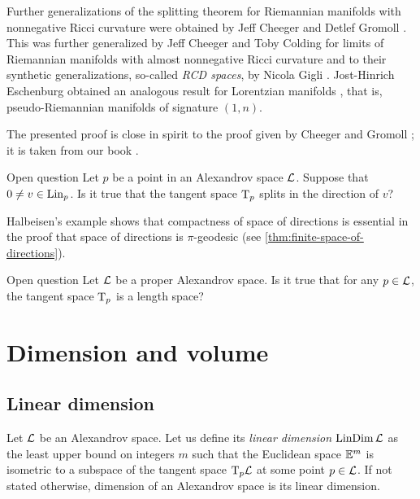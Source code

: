 Further generalizations of the splitting theorem for Riemannian manifolds with nonnegative Ricci curvature were obtained by Jeff Cheeger and Detlef Gromoll \cite{cheeger-gromoll-split}.
This was further generalized by Jeff Cheeger and Toby Colding for limits of Riemannian manifolds with almost nonnegative Ricci curvature \cite{cheeger-colding-alm-rigidity} and to their synthetic generalizations, so-called {}\emph{RCD spaces}, by Nicola Gigli \cite{gigli2013splitting, gigli-splitting-overview}.
Jost-Hinrich Eschenburg obtained an analogous result for  Lorentzian manifolds \cite{eshenburg-split}, that is, pseudo-Riemannian manifolds of signature $(1,n)$.

The presented proof is close in spirit to the proof given by Cheeger and Gromoll \cite{cheeger-gromoll-split};
it is taken from our book \cite{alexander-kapovitch-petrunin2024}.

\begin{thm}{Open question}
Let $p$ be a point in an Alexandrov space $\mathcal{L}$.
Suppose that $0\ne v\in \mathop{\rm Lin}\nolimits_p$.
Is it true that the tangent space $\mathrm{T}_p$ splits in the direction of $v$?
\end{thm}

Halbeisen's example \cite{alexander-kapovitch-petrunin2024,halbeisen} shows that compactness of space of directions is essential in the proof that space of directions is $\pi$-geodesic (see \ref{thm:finite-space-of-directions}).

\begin{thm}{Open question}\label{open:Halb-proper}
Let $\mathcal{L}$ be a proper Alexandrov space.
Is it true that for any $p\in \mathcal{L}$, the tangent space $\mathrm{T}_p$ is a length space?
\end{thm}


\chapter{Dimension and volume}\label{chap:dim}

\section{Linear dimension}

Let $\mathcal{L}$ be an Alexandrov space.
Let us define its \emph{linear dimension} $\mathop{\rm LinDim}\nolimits \mathcal{L}$ as the least upper bound on integers $m$ such that 
the Euclidean space $\mathbb{E}^m$ is isometric to a subspace of the tangent space $\mathrm{T}_p\mathcal{L}$ at some point $p\in \mathcal{L}$.
If not stated otherwise, dimension of an Alexandrov space is its linear dimension.

